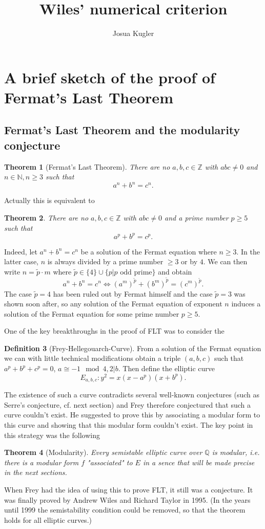 \documentclass{article}
\title{Wiles' numerical criterion}
\author{Josua Kugler}
\theoremstyle{plain}%
\newtheorem{theorem}{Theorem}[section]
\theoremstyle{definition}
\newtheorem{definition}[theorem]{Definition}
\theoremstyle{remark}
\begin{document}
\maketitle
\tableofcontents
\newpage
\section{A brief sketch of the proof of Fermat's Last Theorem}
\subsection{Fermat's Last Theorem and the modularity conjecture}
\begin{theorem}[Fermat's Last Theorem]
    There are no \(a, b, c \in \mathbb{Z}\) with \(abc \neq 0\) and \(n \in \mathbb{N}, n \geq 3\) such that
    \[
        a^n + b^n = c^n.  
    \]
\end{theorem}
Actually this is equivalent to
\begin{theorem}
    There are no \(a, b, c \in \mathbb{Z}\) with \(abc \neq 0\) and a prime number \(p \geq 5\) such that
    \[
        a^p + b^p = c^p.  
    \]
\end{theorem}
Indeed, let \(a^n + b^n = c^n\) be a solution of the Fermat equation where \(n \geq 3\).
In the latter case, \(n\) is always divided by a prime number \(\geq 3\) or by \(4\).
We can then write \(n = \tilde{p} \cdot m\) where \(\tilde p \in \{4\} \cup \{p | p \text{ odd prime}\}\)
and obtain 
\[
    a^n + b^n = c^n \Leftrightarrow (a^m)^{\tilde p} + (b^m)^{\tilde p} = (c^m)^{\tilde p}.  
\]
The case \(\tilde p = 4\) has been ruled out by Fermat himself and the case \(\tilde p = 3\)
was shown soon after, so any solution of the Fermat equation of exponent \(n\) 
induces a solution of the Fermat equation for some prime number \(p\geq 5\).

One of the key breakthroughs in the proof of FLT was to consider the
\begin{definition}[Frey-Hellegouarch-Curve]
    From a solution of the Fermat equation we can with little technical modifications obtain a triple \((a,b,c)\) 
    such that \(a^p + b^p + c^p = 0\), \(a \cong -1 \mod 4, 2|b\). Then define the elliptic curve
    \[
        E_{a,b,c}\colon y^2 = x(x-a^p)(x+b^p).
    \]
\end{definition}
The existence of such a curve contradicts several well-known 
conjectures (such as Serre's conjecture, cf. next section) 
and Frey therefore conjectured that such a curve couldn't exist.
He suggested to prove this by associating a modular form to this curve and showing that this modular form couldn't exist.
The key point in this strategy was the following
\begin{theorem}[Modularity]\label{th:modularity}
    Every semistable elliptic curve over \(\mathbb Q\) is modular, i.e. there is a modular form \(f\) "associated" to \(E\)
    in a sence that will be made precise in the next sections.
\end{theorem}
When Frey had the idea of using this to prove FLT, it still was a conjecture.
It was finally proved by Andrew Wiles and Richard Taylor in 1995.
(In the years until 1999 the semistability condition could be removed, so that
the theorem holds for all elliptic curves.)
\end{document}
